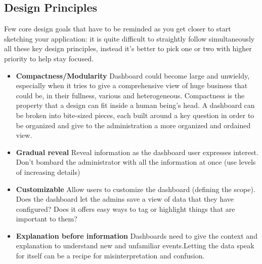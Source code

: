 \documentclass[a4paper,13pt]{report}
\begin{document}
\subsection{Design Principles}
Few core design goals that have to be reminded as you get closer to start sketching your application: it is quite difficult to straightly follow simultaneously all these key design principles, instead it's better to pick one or two with higher priority to help stay focused.
\begin{itemize}
    \item \textbf{Compactness/Modularity}\newline
    Dashboard could become large and unwieldy, especially when it tries to give a comprehensive view of huge business that could be, in their fullness, various and heterogeneous. Compactness is the property that a design can fit inside a human being's head.
    A dashboard can be broken into bite-sized pieces, each built around a key question in order to be organized and give to the administration a more organized and ordained view.
    \item \textbf{Gradual reveal}\newline
    Reveal information as the dashboard user expresses interest. Don't bombard the administrator with all the information at once (use levels of increasing details)
    \item \textbf{Customizable}\newline   
    Allow users to customize the dashboard (defining the scope). 
    Does the dashboard let the admins save a view of data that they have configured? \newline
    Does it offers easy ways to tag or highlight things that are important to them?
    \item \textbf{Explanation before information}\newline
    Dashboards need to give the context and explanation to understand new and unfamiliar events.Letting the data speak for itself can be a recipe for misinterpretation and confusion.
\end{itemize}
\end{document}
